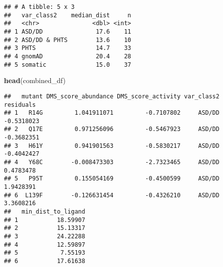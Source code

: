 \documentclass[
]{article}
\newenvironment{Shaded}{\begin{snugshade}}{\end{snugshade}}
\newcommand{\FunctionTok}[1]{\textcolor[rgb]{0.13,0.29,0.53}{\textbf{#1}}}
\newcommand{\NormalTok}[1]{#1}
\begin{document}
\begin{verbatim}
## # A tibble: 5 x 3
##   var_class2    median_dist     n
##   <chr>               <dbl> <int>
## 1 ASD/DD               17.6    11
## 2 ASD/DD & PHTS        13.6    10
## 3 PHTS                 14.7    33
## 4 gnomAD               20.4    28
## 5 somatic              15.0    37
\end{verbatim}

\begin{Shaded}
\begin{Highlighting}[]
\FunctionTok{head}\NormalTok{(combined\_df)}
\end{Highlighting}
\end{Shaded}

\begin{verbatim}
##   mutant DMS_score_abundance DMS_score_activity var_class2  residuals
## 1   R14G         1.041911071         -0.7107802     ASD/DD -0.5318023
## 2   Q17E         0.971256096         -0.5467923     ASD/DD -0.3682351
## 3   H61Y         0.941901563         -0.5830217     ASD/DD -0.4042427
## 4   Y68C        -0.008473303         -2.7323465     ASD/DD  0.4783478
## 5   P95T         0.155054169         -0.4500599     ASD/DD  1.9428391
## 6  L139F        -0.126631454         -0.4326210     ASD/DD  3.3608216
##   min_dist_to_ligand
## 1           18.59907
## 2           15.13317
## 3           24.22288
## 4           12.59897
## 5            7.55193
## 6           17.61638
\end{verbatim}
\end{document}
